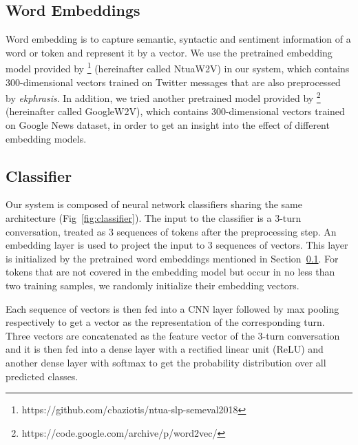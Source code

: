 \documentclass[11pt,a4paper]{article}
\begin{document}
\subsection{Word Embeddings}
\label{ssec:word_emb}

Word embedding is to capture semantic, syntactic and sentiment information of a word or token and represent it by a vector. We use the pretrained embedding model provided by \citet{Baziotis2018SE1803} \footnote{https://github.com/cbaziotis/ntua-slp-semeval2018} (hereinafter called NtuaW2V) in our system, which contains 300-dimensional vectors trained on Twitter messages that are also preprocessed by {\em ekphrasis}. In addition, we tried another pretrained model provided by \citet{Mikolov2013Distributed} \footnote{https://code.google.com/archive/p/word2vec/} (hereinafter called GoogleW2V), which contains 300-dimensional vectors trained on Google News dataset, in order to get an insight into the effect of different embedding models.

\subsection{Classifier}

Our system is composed of neural network classifiers sharing the same architecture (Fig~\ref{fig:classifier}). The input to the classifier is a 3-turn conversation, treated as 3 sequences of tokens after the preprocessing step. An embedding layer is used to project the input to 3 sequences of vectors. This layer is initialized by the pretrained word embeddings mentioned in Section~\ref{ssec:word_emb}. For tokens that are not covered in the embedding model but occur in no less than two training samples, we randomly initialize their embedding vectors.

Each sequence of vectors is then fed into a CNN layer followed by max pooling respectively to get a vector as the representation of the corresponding turn. Three vectors are concatenated as the feature vector of the 3-turn conversation and it is then fed into a dense layer with a rectified linear unit (ReLU) and another dense layer with softmax to get the probability distribution over all predicted classes.
\end{document}
